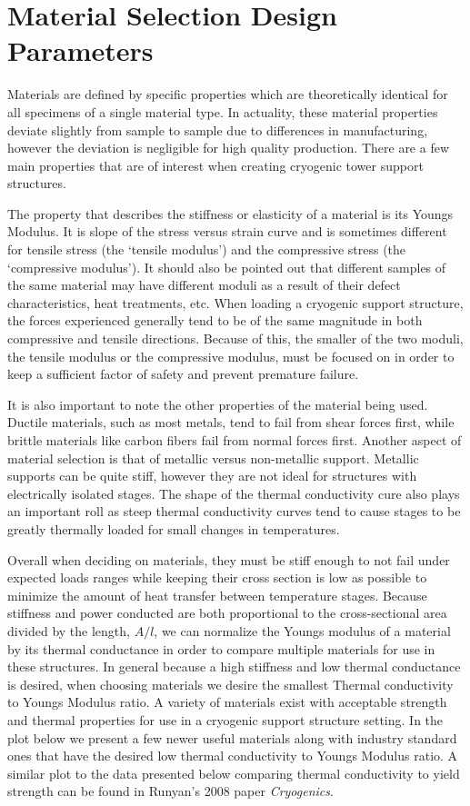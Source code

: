 \documentclass[final]{svjour2}
\begin{document}
\section{Material Selection Design Parameters}

Materials are defined by specific properties which are theoretically identical for all specimens of a single material type.  In actuality, these material properties deviate slightly from sample to sample due to differences in manufacturing, however the deviation is negligible for high quality production.  There are a few main properties that are of interest when creating cryogenic tower support structures.  

The property that describes the stiffness or elasticity of a material is its Youngs Modulus. It is slope of the stress versus strain curve and is sometimes different for tensile stress (the `tensile modulus') and the compressive stress (the `compressive modulus'). It should also be pointed out that different samples of the same material may have different moduli as a result of their defect characteristics, heat treatments, etc. When loading a cryogenic support structure, the forces experienced generally tend to be of the same magnitude in both compressive and tensile directions.  Because of this, the smaller of the two moduli, the tensile modulus or the compressive modulus, must be focused on in order to keep a sufficient factor of safety and prevent premature failure.

It is also important to note the other properties of the material being used.  Ductile materials, such as most metals, tend to fail from shear forces first, while brittle materials like carbon fibers fail from normal forces first.  Another aspect of material selection is that of metallic versus non-metallic support. Metallic supports can be quite stiff, however they are not ideal for structures with electrically isolated stages.  The shape of the thermal conductivity cure also plays an important roll as steep thermal conductivity curves tend to cause stages to be greatly thermally loaded for small changes in temperatures.

Overall when deciding on materials, they must be stiff enough to not fail under expected loads ranges while keeping their cross section is low as possible to minimize the amount of heat transfer between temperature stages. Because stiffness and power conducted are both proportional to the cross-sectional area divided by the length, $A/l$, we can normalize the Youngs modulus of a material by its thermal conductance in order to compare multiple materials for use in these structures.  In general because a high stiffness and low thermal conductance is desired, when choosing materials we desire the smallest Thermal conductivity to Youngs Modulus ratio.\cite{Hastings1993}  A variety of materials exist with acceptable strength and thermal properties for use in a cryogenic support structure setting.  In the plot below we present a few newer useful materials along with industry standard ones that have the desired low thermal conductivity to Youngs Modulus ratio. A similar plot to the data presented below comparing thermal conductivity to yield strength can be found in Runyan's 2008 paper {\it Cryogenics}.\cite{Runyan2008}
\end{document}
